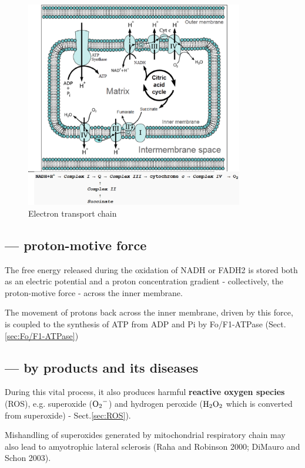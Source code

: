 
\begin{figure}[hbt]
  \centerline{\includegraphics[height=9cm,
    angle=0]{./images/mito_electrontransportchain.eps}}
\caption{Electron transport chain}
\label{fig:mito_electrontransportchain}
\end{figure}

\subsection{--- proton-motive force}
\label{sec:proton-motive-force}

The free energy released during the oxidation of NADH or FADH2 is stored both
as an electric potential and a proton concentration gradient - collectively, the
proton-motive force - across the inner membrane.

The movement of protons back across the inner membrane, driven by this force,
is coupled to the synthesis of ATP from ADP and Pi by Fo/F1-ATPase
(Sect.\ref{sec:Fo/F1-ATPase})

\subsection{--- by products and its diseases}

During this vital process, it also produces harmful {\bf reactive oxygen
species} (ROS), e.g. superoxide ($\ce{O2-}$) and hydrogen peroxide
($\ce{H2O2}$ which is converted from superoxide) - Sect.\ref{sec:ROS}).

Mishandling of superoxides generated by mitochondrial respiratory chain may also
lead to amyotrophic lateral sclerosis (Raha and Robinson 2000; DiMauro and Schon
2003).


